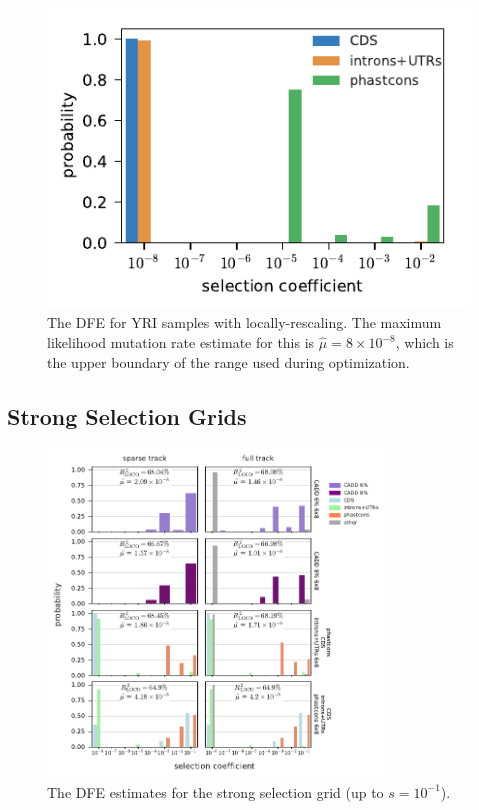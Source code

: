 \documentclass[11pt]{article}
\begin{document}
\begin{figure}[htbp]
    \label{suppfig:rescale-dfe}
  \centering
  \includegraphics[]{figures/supplementary/rescale_DFE.pdf}

  \caption{The DFE for YRI samples with locally-rescaling. The maximum
  likelihood mutation rate estimate for this is $\widehat{\mu} = 8 \times
10^{-8}$, which is the upper boundary of the range used during optimization.}

\end{figure}



\subsection{Strong Selection Grids}
\label{supp:strong-sel-grid}

\begin{figure}[htbp]
    \label{suppfig:strong-sel-dfe}
  \centering
  \includegraphics[width=0.8\textwidth]{figures/supplementary/strongsel_grid_dfe.pdf}
  \caption{The DFE estimates for the strong selection grid (up to $s=10^{-1}$).}
\end{figure}
\end{document}
